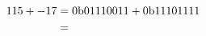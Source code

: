\documentclass{article}
\begin{document}
\pagecolor{black}
\color{white}


\newpage{}

\newpage{}

\newpage{}

\newpage{}

\newpage{}

\newpage{}

\newpage{}

\newpage{}

    \begin{align*}
        115 + -17 &= 0\text b01110011 + 0\text b11101111 \\
                  &= 
    \end{align*}

\newpage{}
\end{document}
